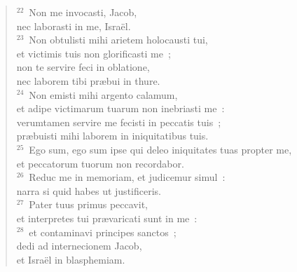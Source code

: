 \begin{flushleft}\begin{verse}${}^{22}$~Non me invocasti, Jacob,\\ nec laborasti in me, Isra\"el.\\
${}^{23}$~Non obtulisti mihi arietem holocausti tui,\\ et victimis tuis non glorificasti me~;\\ non te servire feci in oblatione,\\ nec laborem tibi pr\ae bui in thure.\\
${}^{24}$~Non emisti mihi argento calamum,\\ et adipe victimarum tuarum non inebriasti me~:\\ verumtamen servire me fecisti in peccatis tuis~;\\ pr\ae buisti mihi laborem in iniquitatibus tuis.\\
${}^{25}$~Ego sum, ego sum ipse qui deleo iniquitates tuas propter me,\\ et peccatorum tuorum non recordabor.\\
${}^{26}$~Reduc me in memoriam, et judicemur simul~:\\ narra si quid habes ut justificeris.\\
${}^{27}$~Pater tuus primus peccavit,\\ et interpretes tui pr\ae varicati sunt in me~:\\
${}^{28}$~et contaminavi principes sanctos~;\\ dedi ad internecionem Jacob,\\ et Isra\"el in blasphemiam.\end{verse}\end{flushleft}


